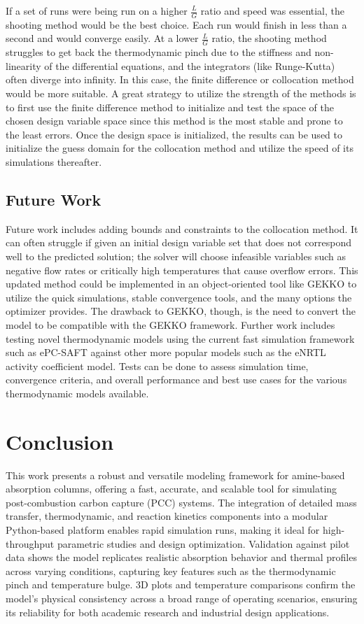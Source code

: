 \documentclass[a4paper,fleqn]{cas-sc}
\begin{document}
    If a set of runs were being run on a higher $\frac{L}{G}$ ratio and speed was essential, the shooting method would be the best choice. Each run would finish in less than a second and would converge easily. At a lower $\frac{L}{G}$ ratio, the shooting method struggles to get back the thermodynamic pinch due to the stiffness and non-linearity of the differential equations, and the integrators (like Runge-Kutta) often diverge into infinity. In this case, the finite difference or collocation method would be more suitable. A great strategy to utilize the strength of the methods is to first use the finite difference method to initialize and test the space of the chosen design variable space since this method is the most stable and prone to the least errors. Once the design space is initialized, the results can be used to initialize the guess domain for the collocation method and utilize the speed of its simulations thereafter.


    \subsection{Future Work}
    Future work includes adding bounds and constraints to the collocation method. It can often struggle if given an initial design variable set that does not correspond well to the predicted solution; the solver will choose infeasible variables such as negative flow rates or critically high temperatures that cause overflow errors. This updated method could be implemented in an object-oriented tool like GEKKO to utilize the quick simulations, stable convergence tools, and the many options the optimizer provides. The drawback to GEKKO, though, is the need to convert the model to be compatible with the GEKKO framework. Further work includes testing novel thermodynamic models using the current fast simulation framework such as ePC-SAFT against other more popular models such as the eNRTL activity coefficient model. Tests can be done to assess simulation time, convergence criteria, and overall performance and best use cases for the various thermodynamic models available.


    \section{Conclusion}
    This work presents a robust and versatile modeling framework for amine-based absorption columns, offering a fast, accurate, and scalable tool for simulating post-combustion carbon capture (PCC) systems. The integration of detailed mass transfer, thermodynamic, and reaction kinetics components into a modular Python-based platform enables rapid simulation runs, making it ideal for high-throughput parametric studies and design optimization. Validation against pilot data shows the model replicates realistic absorption behavior and thermal profiles across varying conditions, capturing key features such as the thermodynamic pinch and temperature bulge. 3D plots and temperature comparisons confirm the model’s physical consistency across a broad range of operating scenarios, ensuring its reliability for both academic research and industrial design applications.
\end{document}

